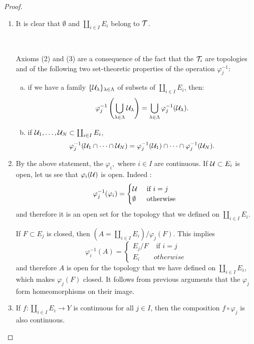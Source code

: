 \begin{proof}
\begin{enumerate}
\item It is clear that $\emptyset$ and $\coprod_{i\in I}E_{i}$ belong to $\mathcal{T}$.

\, 

Axioms (2) and (3) are a consequence of
the fact that the $\mathcal{T}_{i}$ are topologies and of the following two set-theoretic properties of the operation $\varphi_{j}^{-1}$:

\vspace{5pt}
\begin{enumerate}[a)]
\item if we have a family $\{\mathcal{U}_{\lambda}\}_{\lambda\in\Lambda}$ of subsets of $\coprod_{i\in I}E_{i} $, then:
\[
\varphi_{j}^{-1}\left(\bigcup_{\lambda\in\Lambda}\mathcal{U}_{\lambda}\right)=\bigcup_{\lambda\in\Lambda} \varphi_{j}^{-1}(\mathcal{U}_{\lambda}).
\]

 \vspace{3pt} 
\item if $\mathcal{U}_{1},\dots,\mathcal{U}_{N} \subset \coprod_{i\in I}E_{i}$, \[ \varphi_{j}^{-1}(\mathcal{U}_{1} \cap \dots \cap \mathcal{U}_{N})=\varphi_{j}^{-1}(\mathcal{U}_{1} )\cap\dots \cap\varphi_{j}^{-1}(\mathcal{U}_{N}).\] 
\end{enumerate}

 \vspace{5pt}
 \item By the above statement, the $\varphi_{i},$ where $ i \in I$ are continuous. If $\mathcal{U} \subset E_{i}$ is open, let us see that $\varphi_{i}(\mathcal{U})$ is open. Indeed : 
 \[
 \varphi_{j}^{-1}(\varphi_{i})=\begin{cases} \mathcal{U}& \text{ if } i=j\\ \emptyset & \text{ otherwise }\end{cases}
 \]
  and therefore it is an open set for the topology that we defined on $ \coprod_{i\in I}E_{i}$.


If $F\subset E_{j}$ is closed, then $\left(A=\coprod_{i\in I}E_i\right)/\varphi_j(F)$. This implies 
\[\varphi_i^{-1}(A)=\begin{cases} E_j/F & \text{ if } i=j\\ E_i & otherwise
\end{cases}\]
and therefore $A$ is open for the topology that we have defined on $\coprod_{i\in I}E_i$, which makes $\varphi_j(F)$ closed. It follows from previous arguments that the $\varphi_{j}$ form homeomorphisms on their image.

\vspace{5pt}
\item If $f: \coprod\limits_{i\in I}E_i\to Y$ is continuous for all $j \in I$, then the composition $f \circ \varphi_j$ is also continuous.


\end{enumerate}
\end{proof}
